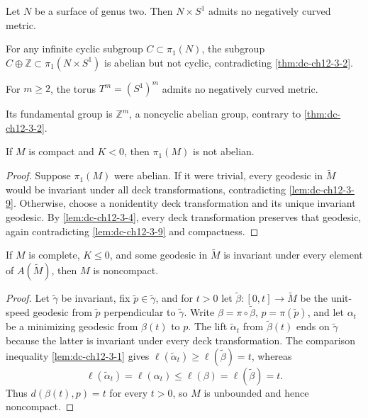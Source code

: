 \begin{example}
  \label{ex:dc-ch12-3-6}
  Let $N$ be a surface of genus two. Then $N\times S^1$ admits no negatively
  curved metric.

  \sketch
  For any infinite cyclic subgroup $C\subset\pi_1(N)$, the subgroup
  $C\oplus\mathbb Z\subset\pi_1(N\times S^1)$ is abelian but not cyclic,
  contradicting \cref{thm:dc-ch12-3-2}.
\end{example}

\begin{example}
  \label{ex:dc-ch12-3-7}
  For $m\geq2$, the torus $T^m=(S^1)^m$ admits no negatively curved metric.

  \sketch
  Its fundamental group is $\mathbb Z^m$, a noncyclic abelian group, contrary
  to \cref{thm:dc-ch12-3-2}.
\end{example}

\begin{theorem}
  \label{thm:dc-ch12-3-8}
  If $M$ is compact and $K<0$, then $\pi_1(M)$ is not abelian.
\end{theorem}
\begin{proof}
  \sketch
  Suppose $\pi_1(M)$ were abelian. If it were trivial, every geodesic in
  $\tilde M$ would be invariant under all deck transformations, contradicting
  \cref{lem:dc-ch12-3-9}. Otherwise, choose a nonidentity deck transformation
  and its unique invariant geodesic. By \cref{lem:dc-ch12-3-4}, every deck
  transformation preserves that geodesic, again contradicting
  \cref{lem:dc-ch12-3-9} and compactness.
\end{proof}

\begin{lemma}
  \label{lem:dc-ch12-3-9}
  If $M$ is complete, $K\leq0$, and some geodesic in $\tilde M$ is invariant
  under every element of $A(\tilde M)$, then $M$ is noncompact.
\end{lemma}
\begin{proof}
  \sketch
  Let $\tilde\gamma$ be invariant, fix $\tilde p\in\tilde\gamma$, and for
  $t>0$ let $\tilde\beta:[0,t]\to\tilde M$ be the unit-speed geodesic from
  $\tilde p$ perpendicular to $\tilde\gamma$. Write
  $\beta=\pi\circ\tilde\beta$, $p=\pi(\tilde p)$, and let $\alpha_t$ be a
  minimizing geodesic from $\beta(t)$ to $p$. The lift $\tilde\alpha_t$ from
  $\tilde\beta(t)$ ends on $\tilde\gamma$ because the latter is invariant under
  every deck transformation. The comparison inequality
  \cref{lem:dc-ch12-3-1} gives
  $\ell(\tilde\alpha_t)\geq\ell(\tilde\beta)=t$, whereas
  \[
    \ell(\tilde\alpha_t)=\ell(\alpha_t)
    \leq\ell(\beta)=\ell(\tilde\beta)=t.
  \]
  Thus $d(\beta(t),p)=t$ for every $t>0$, so $M$ is unbounded and hence
  noncompact.
\end{proof}

